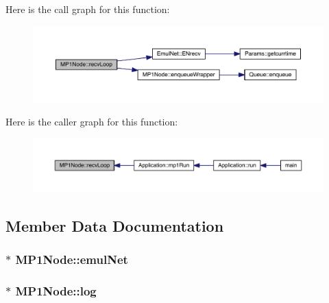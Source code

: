 Here is the call graph for this function\+:\nopagebreak
\begin{figure}[H]
\begin{center}
\leavevmode
\includegraphics[width=350pt]{db/d4b/class_m_p1_node_a61c78c68e9033a5ff52c3fc2e1a3982b_cgraph}
\end{center}
\end{figure}




Here is the caller graph for this function\+:\nopagebreak
\begin{figure}[H]
\begin{center}
\leavevmode
\includegraphics[width=350pt]{db/d4b/class_m_p1_node_a61c78c68e9033a5ff52c3fc2e1a3982b_icgraph}
\end{center}
\end{figure}




\subsection{Member Data Documentation}
\hypertarget{class_m_p1_node_a449d3fc835bd980a1fd9af2072f05b0e}{}
\subsubsection[{emul\+Net}]{$\ast$ M\+P1\+Node\+::emul\+Net\hspace{0.3cm}{\ttfamily [private]}}\label{class_m_p1_node_a449d3fc835bd980a1fd9af2072f05b0e}
\hypertarget{class_m_p1_node_aaba40df80a4669363245ac74c3ff19f5}{}
\subsubsection[{log}]{$\ast$ M\+P1\+Node\+::log\hspace{0.3cm}{\ttfamily [private]}}\label{class_m_p1_node_aaba40df80a4669363245ac74c3ff19f5}
\hypertarget{class_m_p1_node_a328d012a8827407b51ea765ee420b8a3}{}
